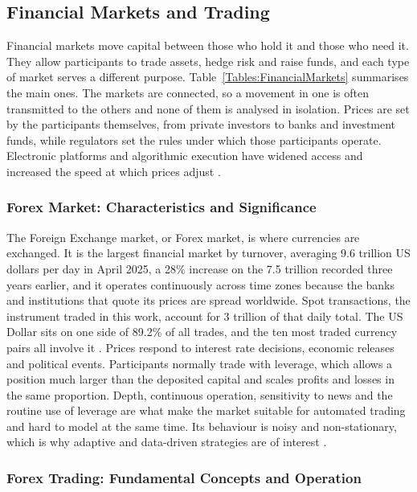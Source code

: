 \subsection{Financial Markets and Trading}

Financial markets move capital between those who hold it and those who need it. They allow participants to trade assets, hedge risk and raise funds, and each type of market serves a different purpose. Table~\ref{Tables:FinancialMarkets} summarises the main ones. The markets are connected, so a movement in one is often transmitted to the others and none of them is analysed in isolation. Prices are set by the participants themselves, from private investors to banks and investment funds, while regulators set the rules under which those participants operate. Electronic platforms and algorithmic execution have widened access and increased the speed at which prices adjust \cite{brandimarte_introduction_2018}.



\subsubsection{Forex Market: Characteristics and Significance}

The Foreign Exchange market, or Forex market, is where currencies are exchanged. It is the largest financial market by turnover, averaging 9.6 trillion US dollars per day in April 2025, a 28\% increase on the 7.5 trillion recorded three years earlier, and it operates continuously across time zones because the banks and institutions that quote its prices are spread worldwide. Spot transactions, the instrument traded in this work, account for 3 trillion of that daily total. The US Dollar sits on one side of 89.2\% of all trades, and the ten most traded currency pairs all involve it \cite{bis_otc_2025}. Prices respond to interest rate decisions, economic releases and political events. Participants normally trade with leverage, which allows a position much larger than the deposited capital and scales profits and losses in the same proportion. Depth, continuous operation, sensitivity to news and the routine use of leverage are what make the market suitable for automated trading and hard to model at the same time. Its behaviour is noisy and non-stationary, which is why adaptive and data-driven strategies are of interest \cite{donnelly_art_2019}.

\subsubsection{Forex Trading: Fundamental Concepts and Operation}

